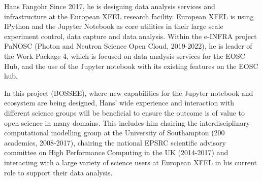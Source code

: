 \begin{participant}[type=leadPI,PM=4,gender=male]{Hans Fangohr}
  Since 2017, he is designing data analysis services and
  infrastructure at the European XFEL research facility. European XFEL
  is using IPython and the Jupyter Notebook as core utilities in their
  large scale experiment control, data capture and data
  analysis. Within the e-INFRA project PaNOSC (Photon and Neutron
  Science Open Cloud, 2019-2022), he is leader of the Work Package 4,
  which is focused on data analysis services for the EOSC Hub, and the
  use of the Jupyter notebook with its existing features on the EOSC
  hub.

  In this project (BOSSEE), where new capabilities for the Jupyter
  notebook and ecosystem are being designed, Hans' wide experience and
  interaction with different science groups will be beneficial to
  ensure the outcome is of value to open science in many domains. This
  includes him chairing the interdisciplinary computational modelling
  group at the University of Southampton (200 academics, 2008-2017),
  chairing the national EPSRC scientific advisory committee on High
  Performance Computing in the UK (2014-2017) and interacting with a
  large variety of science users at European XFEL in his current role
  to support their data analysis.
\end{participant}

